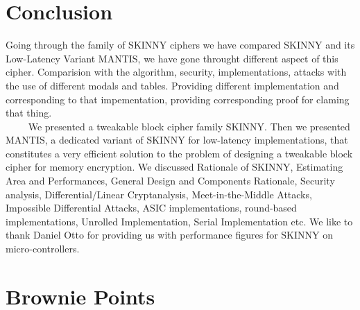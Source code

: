 \documentclass[preprint]{transcrypto}
\begin{document}
{\section{Conclusion}
\tab Going through the family of SKINNY ciphers we have compared SKINNY and its Low-Latency Variant MANTIS, we have gone throught different aspect of this cipher. Comparision with the algorithm, security, implementations, attacks with the use of different modals and tables. Providing different implementation and corresponding to that impementation, providing corresponding proof for claming that thing.\\
\tab$\quad\quad$ We presented a  tweakable block cipher family SKINNY. Then we presented MANTIS, a dedicated variant of SKINNY for low-latency implementations, that constitutes a very efficient solution to the problem of designing a tweakable block cipher for memory encryption. We discussed Rationale of SKINNY, Estimating Area and Performances, General Design and Components Rationale, Security analysis,  Differential/Linear Cryptanalysis, Meet-in-the-Middle Attacks, Impossible Differential Attacks, ASIC implementations, round-based implementations, Unrolled Implementation, Serial Implementation etc. We like to thank Daniel Otto for providing us with performance figures for SKINNY on micro-controllers.

\section{Brownie Points}
}
\end{document}
